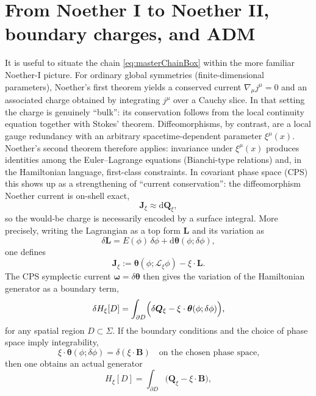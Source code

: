 \documentclass[
  reprint,
  amsmath,amssymb,
  aps,
  prd,
  superscriptaddress,
  nofootinbib,
  longbibliography
]{revtex4-2}
\newcommand{\dd}{\mathrm{d}}
\newcommand{\Lie}{\mathcal{L}}
\newcommand{\on}{\approx}
\newcommand{\Lform}{\bm{L}}
\newcommand{\tht}{\bm{\theta}}
\newcommand{\om}{\bm{\omega}}
\newcommand{\J}{\bm{J}}
\newcommand{\Q}{\bm{Q}}
\newcommand{\Bnd}{\bm{B}}
\begin{document}
\section{From Noether I to Noether II, boundary charges, and ADM}
It is useful to situate the chain \eqref{eq:masterChainBox} within the more familiar Noether-I picture.
For ordinary global symmetries (finite-dimensional parameters), Noether's first theorem yields a conserved current
$\nabla_\mu j^\mu = 0$ and an associated charge obtained by integrating $j^\mu$ over a Cauchy slice.
In that setting the charge is genuinely ``bulk'': its conservation follows from the local continuity equation together with Stokes' theorem.
Diffeomorphisms, by contrast, are a local gauge redundancy with an arbitrary spacetime-dependent parameter $\xi^\mu(x)$.
Noether's second theorem therefore applies: invariance under $\xi^\mu(x)$ produces identities among the Euler--Lagrange equations
(Bianchi-type relations) and, in the Hamiltonian language, first-class constraints.
In covariant phase space (CPS) this shows up as a strengthening of ``current conservation'': the diffeomorphism Noether current is on-shell exact,
\begin{equation}
  \J_\xi \on \dd \Q_\xi ,
\end{equation}
so the would-be charge is necessarily encoded by a surface integral.
More precisely, writing the Lagrangian as a top form $\Lform$ and its variation as
\begin{equation}
\delta\Lform = E(\phi)\,\delta\phi + \dd\tht(\phi;\delta\phi),
\end{equation}
one defines
\begin{equation}
\J_\xi := \tht(\phi;\Lie_\xi\phi)-\xi\cdot\Lform.
\end{equation}
The CPS symplectic current $\om=\delta\tht$ then gives the variation of the Hamiltonian generator as a boundary term,
\begin{equation}
  \delta H_\xi[D]=\int_{\partial D}\Bigl(\delta\Q_\xi-\xi\cdot\tht(\phi;\delta\phi)\Bigr),
\label{eq:dHxi}
\end{equation}
for any spatial region $D\subset\Sigma$.
If the boundary conditions and the choice of phase space imply integrability,
\begin{equation}
\xi\cdot\tht(\phi;\delta\phi)=\delta(\xi\cdot\Bnd)
\quad \text{on the chosen phase space,}
\label{eq:integrability}
\end{equation}
then one obtains an actual generator
\begin{equation}
  H_\xi[D]=\int_{\partial D}\bigl(\Q_\xi-\xi\cdot\Bnd\bigr),
\label{eq:Hxi}
\end{equation}
\end{document}
